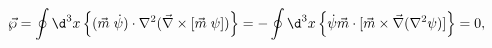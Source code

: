 \begin{equation}
\vec \wp = \oint \d^3 x \left\{ 
(\vec m\; \dot\psi) \cdot \nabla^2 (\vec\nabla\times[\vec m\; \psi])
\right\}
=
-\oint \d^3 x \left\{ 
\dot\psi \vec m \cdot [\vec m \times \vec\nabla (\nabla^2  \psi)] 
\right\} = 0,
\end{equation}

